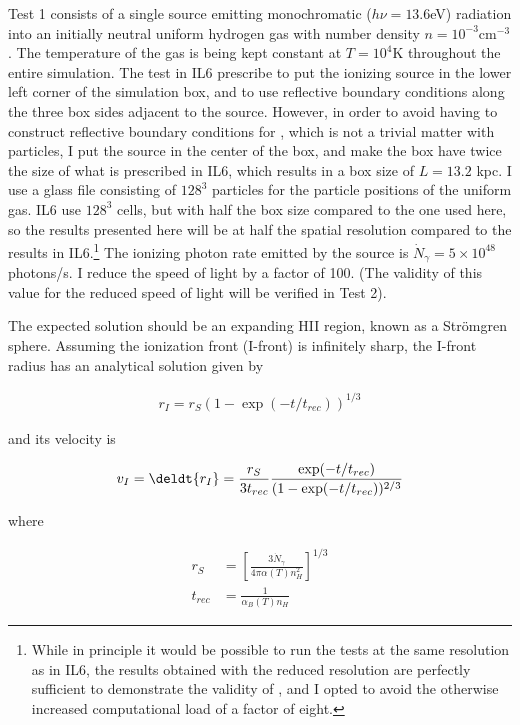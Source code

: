 Test 1 consists of a single source emitting monochromatic ($h\nu = 13.6$eV) radiation into an
initially neutral uniform hydrogen gas with number density $n = 10^{-3}$cm$^{-3}$. The temperature
of the gas is being kept constant at $T = 10^4$K throughout the entire simulation. The test in IL6
prescribe to put the ionizing source in the lower left corner of the simulation box, and to use
reflective boundary conditions along the three box sides adjacent to the source. However, in order
to avoid having to construct reflective boundary conditions for \GEARRT, which is not a trivial
matter with particles, I put the source in the center of the box, and make the box have twice the
size of what is prescribed in IL6, which results in a box size of $L = 13.2$ kpc. I use a glass file
consisting of $128^3$ particles for the particle positions of the uniform gas. IL6 use $128^3$
cells, but with half the box size compared to the one used here, so the results presented here will
be at half the spatial resolution compared to the results in IL6.\footnote{
While in principle it would be possible to run the tests at the same resolution as in IL6, the
results obtained with the reduced resolution are perfectly sufficient to demonstrate the validity of
\GEARRT, and I opted to avoid the otherwise increased computational load of a factor of eight.}
The ionizing photon rate emitted by the source is $\dot{N}_\gamma = 5 \times 10^{48}$ photons/s. I
reduce the speed of light by a factor of 100. (The validity of this value for the reduced speed of
light will be verified in Test 2).

The expected solution should be an expanding HII region, known as a Str\"omgren sphere. Assuming
the ionization front (I-front) is infinitely sharp, the I-front radius has an analytical solution
given by

\begin{align}
    r_I = r_S ( 1 - \exp(-t/t_{rec}))^{1/3} \label{eq:rI}
\end{align}

and its velocity is

\begin{align}
    v_I = \deldt{r_I} = \frac{r_S}{3 t_{rec}} \frac{\exp(-t/t_{rec})}{( 1 -
\exp(-t/t_{rec}))^{2/3}} \label{eq:vI}
\end{align}

where

\begin{align}
    r_S &= \left[ \frac{3 \dot{N}_\gamma}{4 \pi \alpha(T) n_H^2} \right]^{1/3} \label{eq:rS} \\
    t_{rec} &= \frac{1}{\alpha_B(T) n_H}
\end{align}

